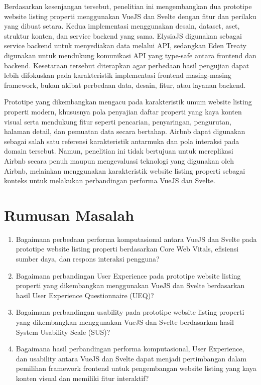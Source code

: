 \documentclass[12pt,a4paper]{report}
\begin{document}
Berdasarkan kesenjangan tersebut, penelitian ini mengembangkan dua prototipe website listing properti menggunakan VueJS dan Svelte dengan fitur dan perilaku yang dibuat setara. Kedua implementasi menggunakan desain, dataset, aset, struktur konten, dan service backend yang sama. ElysiaJS digunakan sebagai service backend untuk menyediakan data melalui API, sedangkan Eden Treaty digunakan untuk mendukung komunikasi API yang type-safe antara frontend dan backend. Kesetaraan tersebut diterapkan agar perbedaan hasil pengujian dapat lebih difokuskan pada karakteristik implementasi frontend masing-masing framework, bukan akibat perbedaan data, desain, fitur, atau layanan backend.

Prototipe yang dikembangkan mengacu pada karakteristik umum website listing properti modern, khususnya pola penyajian daftar properti yang kaya konten visual serta mendukung fitur seperti pencarian, penyaringan, pengurutan, halaman detail, dan pemuatan data secara bertahap. Airbnb dapat digunakan sebagai salah satu referensi karakteristik antarmuka dan pola interaksi pada domain tersebut. Namun, penelitian ini tidak bertujuan untuk mereplikasi Airbnb secara penuh maupun mengevaluasi teknologi yang digunakan oleh Airbnb, melainkan menggunakan karakteristik website listing properti sebagai konteks untuk melakukan perbandingan performa VueJS dan Svelte.

\section{Rumusan Masalah}
\begin{enumerate}
    \item Bagaimana perbedaan performa komputasional antara VueJS dan Svelte pada prototipe website listing properti berdasarkan Core Web Vitals, efisiensi sumber daya, dan respons interaksi pengguna?
    \item Bagaimana perbandingan User Experience pada prototipe website listing properti yang dikembangkan menggunakan VueJS dan Svelte berdasarkan hasil User Experience Questionnaire (UEQ)?
    \item Bagaimana perbandingan usability pada prototipe website listing properti yang dikembangkan menggunakan VueJS dan Svelte berdasarkan hasil System Usability Scale (SUS)?
    \item Bagaimana hasil perbandingan performa komputasional, User Experience, dan usability antara VueJS dan Svelte dapat menjadi pertimbangan dalam pemilihan framework frontend untuk pengembangan website listing yang kaya konten visual dan memiliki fitur interaktif?
\end{enumerate}
\end{document}
